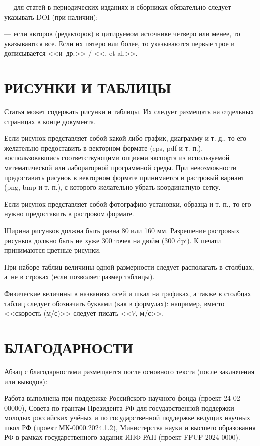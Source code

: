 \documentclass[12pt, a4paper]{article}
\begin{document}
--- для статей в периодических изданиях и сборниках обязательно следует указывать DOI (при наличии);

--- если авторов (редакторов) в цитируемом источнике четверо или менее, то указываются все. Если их пятеро или более, то указываются первые трое и дописывается <<и~др.>> / <<, et al.>>.

\section{РИСУНКИ И ТАБЛИЦЫ}

Статья может содержать рисунки и таблицы. Их следует размещать на отдельных страницах в конце документа.

Если рисунок представляет собой какой-либо график, диаграмму и т. д., то его желательно предоставить в векторном формате (eps, pdf и т. п.), воспользовавшись соответствующими опциями экспорта из используемой математической или лабораторной программной среды. При невозможности предоставить рисунок в векторном формате принимается и растровый вариант (png, bmp и т. п.), с которого желательно убрать координатную сетку.

Если рисунок представляет собой фотографию установки, образца и т. п., то его нужно предоставить в растровом формате.

Ширина рисунков должна быть равна 80 или 160 мм. Разрешение растровых рисунков должно быть не хуже 300 точек на дюйм (300 dpi). К печати принимаются цветные рисунки.

При наборе таблиц величины одной размерности следует располагать в столбцах, а~не в строках (если позволяет размер таблицы).

Физические величины в названиях осей и шкал на графиках, а также в столбцах таблиц следует обозначать буквами (как в формулах): например, вместо <<скорость (м/с)>> следует писать <<$V$, м/с>>.

\section{БЛАГОДАРНОСТИ}

Абзац с благодарностями размещается после основного текста (после заключения или выводов):

Работа выполнена при поддержке Российского научного фонда (проект 24-02-00000), Совета по грантам Президента РФ для государственной поддержки молодых российских учёных и по государственной поддержке ведущих научных школ РФ (проект МК-0000.2024.1.2), Министерства науки и высшего образования РФ в рамках государственного задания ИПФ РАН (проект FFUF-2024-0000).
\end{document}
